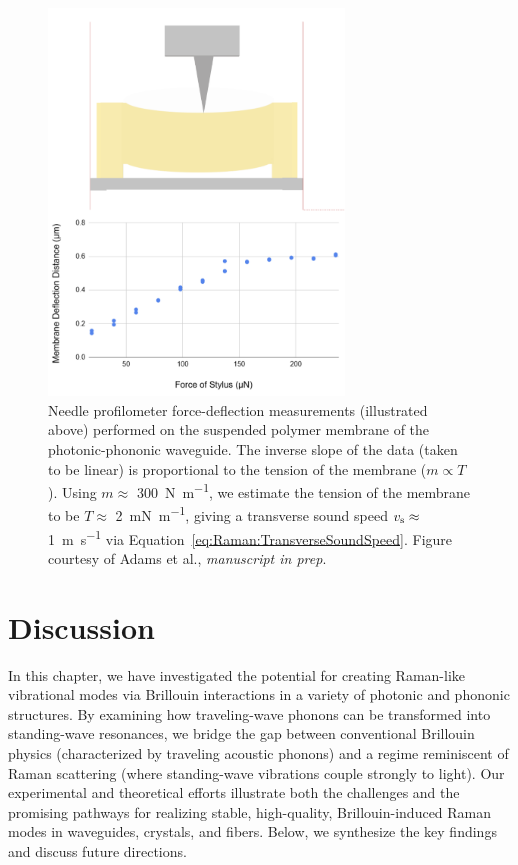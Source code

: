 \begin{figure}[th]
  \centering
  \includegraphics[width=0.7\textwidth]{figs/4-Raman/profilometer.png}
  \caption[Needle profilometer force-deflection measurements performed on the suspended polymer membrane of the photonic-phononic waveguide.]{Needle profilometer force-deflection measurements (illustrated above) performed on the suspended polymer membrane of the photonic-phononic waveguide. The inverse slope of the data (taken to be linear) is proportional to the tension of the membrane (\(m\propto T\)). Using \(m \approx\) \SI{300}{\newton\per\meter}, we estimate the tension of the membrane to be \(T \approx\) \SI{2}{\milli\newton\per\meter}, giving a transverse sound speed \(v_{\rm s} \approx\) \SI{1}{\meter\per\second} via Equation~\ref{eq:Raman:TransverseSoundSpeed}. Figure courtesy of Adams et al., \textit{manuscript in prep}.}
  \label{fig:Raman:profilometer}
\end{figure}


\section{Discussion}
\label{sec:Raman:Discussion}

In this chapter, we have investigated the potential for creating Raman-like vibrational modes via Brillouin interactions in a variety of photonic and phononic structures. By examining how traveling-wave phonons can be transformed into standing-wave resonances, we bridge the gap between conventional Brillouin physics (characterized by traveling acoustic phonons) and a regime reminiscent of Raman scattering (where standing-wave vibrations couple strongly to light). Our experimental and theoretical efforts illustrate both the challenges and the promising pathways for realizing stable, high-quality, Brillouin-induced Raman modes in waveguides, crystals, and fibers. Below, we synthesize the key findings and discuss future directions.

